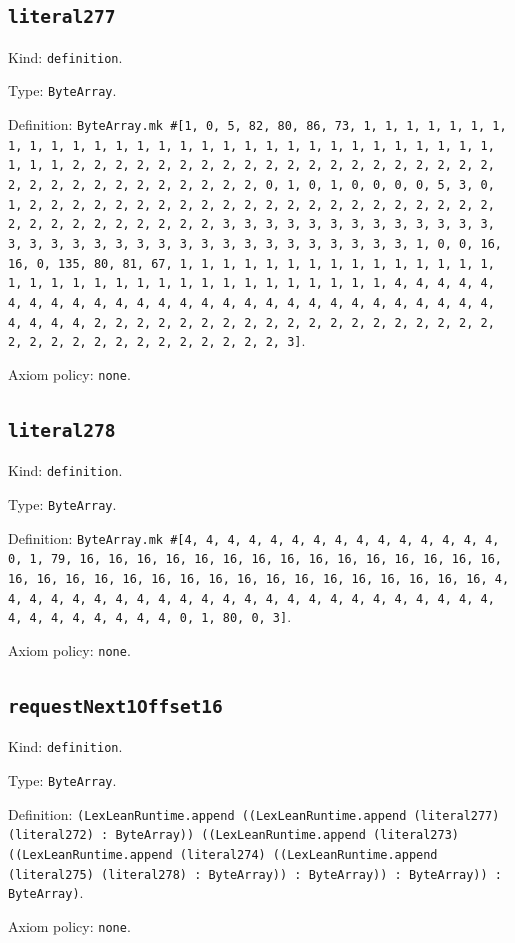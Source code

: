 \documentclass[11pt]{article}
\begin{document}
\subsection*{\texttt{literal277}}
\noindent Kind: \texttt{definition}.\par
\noindent Type: \texttt{ByteArray}.\par
\noindent Definition: \texttt{ByteArray.mk \#[1, 0, 5, 82, 80, 86, 73, 1, 1, 1, 1, 1, 1, 1, 1, 1, 1, 1, 1, 1, 1, 1, 1, 1, 1, 1, 1, 1, 1, 1, 1, 1, 1, 1, 1, 1, 1, 1, 1, 1, 2, 2, 2, 2, 2, 2, 2, 2, 2, 2, 2, 2, 2, 2, 2, 2, 2, 2, 2, 2, 2, 2, 2, 2, 2, 2, 2, 2, 2, 2, 2, 2, 0, 1, 0, 1, 0, 0, 0, 0, 5, 3, 0, 1, 2, 2, 2, 2, 2, 2, 2, 2, 2, 2, 2, 2, 2, 2, 2, 2, 2, 2, 2, 2, 2, 2, 2, 2, 2, 2, 2, 2, 2, 2, 2, 2, 3, 3, 3, 3, 3, 3, 3, 3, 3, 3, 3, 3, 3, 3, 3, 3, 3, 3, 3, 3, 3, 3, 3, 3, 3, 3, 3, 3, 3, 3, 3, 3, 1, 0, 0, 16, 16, 0, 135, 80, 81, 67, 1, 1, 1, 1, 1, 1, 1, 1, 1, 1, 1, 1, 1, 1, 1, 1, 1, 1, 1, 1, 1, 1, 1, 1, 1, 1, 1, 1, 1, 1, 1, 1, 1, 4, 4, 4, 4, 4, 4, 4, 4, 4, 4, 4, 4, 4, 4, 4, 4, 4, 4, 4, 4, 4, 4, 4, 4, 4, 4, 4, 4, 4, 4, 4, 4, 2, 2, 2, 2, 2, 2, 2, 2, 2, 2, 2, 2, 2, 2, 2, 2, 2, 2, 2, 2, 2, 2, 2, 2, 2, 2, 2, 2, 2, 2, 2, 2, 3]}.\par
\noindent Axiom policy: \texttt{none}.\par
\subsection*{\texttt{literal278}}
\noindent Kind: \texttt{definition}.\par
\noindent Type: \texttt{ByteArray}.\par
\noindent Definition: \texttt{ByteArray.mk \#[4, 4, 4, 4, 4, 4, 4, 4, 4, 4, 4, 4, 4, 4, 4, 0, 1, 79, 16, 16, 16, 16, 16, 16, 16, 16, 16, 16, 16, 16, 16, 16, 16, 16, 16, 16, 16, 16, 16, 16, 16, 16, 16, 16, 16, 16, 16, 16, 16, 16, 4, 4, 4, 4, 4, 4, 4, 4, 4, 4, 4, 4, 4, 4, 4, 4, 4, 4, 4, 4, 4, 4, 4, 4, 4, 4, 4, 4, 4, 4, 4, 4, 0, 1, 80, 0, 3]}.\par
\noindent Axiom policy: \texttt{none}.\par
\subsection*{\texttt{requestNext1Offset16}}
\noindent Kind: \texttt{definition}.\par
\noindent Type: \texttt{ByteArray}.\par
\noindent Definition: \texttt{(LexLeanRuntime.append ((LexLeanRuntime.append (literal277) (literal272) : ByteArray)) ((LexLeanRuntime.append (literal273) ((LexLeanRuntime.append (literal274) ((LexLeanRuntime.append (literal275) (literal278) : ByteArray)) : ByteArray)) : ByteArray)) : ByteArray)}.\par
\noindent Axiom policy: \texttt{none}.\par
\end{document}
